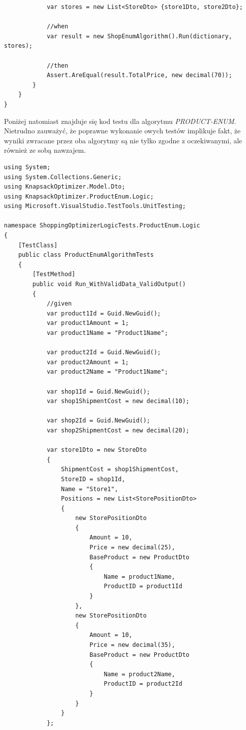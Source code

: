 \documentclass[a4paper]{article}
\begin{document}
\begin{lstlisting}
            var stores = new List<StoreDto> {store1Dto, store2Dto};

            //when
            var result = new ShopEnumAlgorithm().Run(dictionary, stores);

            //then
            Assert.AreEqual(result.TotalPrice, new decimal(70));
        }
    }
}
\end{lstlisting}
Poniżej natomiast znajduje się kod testu dla algorytmu \textit{PRODUCT-ENUM}. Nietrudno zauważyć, że poprawne wykonanie owych testów implikuje fakt, że wyniki zwracane przez oba algorytmy są nie tylko zgodne z oczekiwanymi, ale również ze sobą nawzajem.
\begin{lstlisting}
using System;
using System.Collections.Generic;
using KnapsackOptimizer.Model.Dto;
using KnapsackOptimizer.ProductEnum.Logic;
using Microsoft.VisualStudio.TestTools.UnitTesting;

namespace ShoppingOptimizerLogicTests.ProductEnum.Logic
{
    [TestClass]
    public class ProductEnumAlgorithmTests
    {
        [TestMethod]
        public void Run_WithValidData_ValidOutput()
        {
            //given
            var product1Id = Guid.NewGuid();
            var product1Amount = 1;
            var product1Name = "Product1Name";

            var product2Id = Guid.NewGuid();
            var product2Amount = 1;
            var product2Name = "Product1Name";

            var shop1Id = Guid.NewGuid();
            var shop1ShipmentCost = new decimal(10);

            var shop2Id = Guid.NewGuid();
            var shop2ShipmentCost = new decimal(20);

            var store1Dto = new StoreDto
            {
                ShipmentCost = shop1ShipmentCost,
                StoreID = shop1Id,
                Name = "Store1",
                Positions = new List<StorePositionDto>
                {
                    new StorePositionDto
                    {
                        Amount = 10,
                        Price = new decimal(25),
                        BaseProduct = new ProductDto
                        {
                            Name = product1Name,
                            ProductID = product1Id
                        }
                    },
                    new StorePositionDto
                    {
                        Amount = 10,
                        Price = new decimal(35),
                        BaseProduct = new ProductDto
                        {
                            Name = product2Name,
                            ProductID = product2Id
                        }
                    }
                }
            };


\end{lstlisting}
\end{document}
